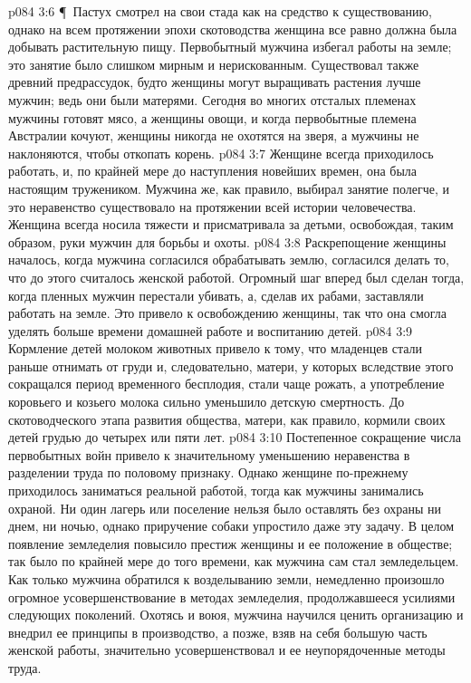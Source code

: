 \vs p084 3:6 \P\ Пастух смотрел на свои стада как на средство к существованию, однако на всем протяжении эпохи скотоводства женщина все равно должна была добывать растительную пищу. Первобытный мужчина избегал работы на земле; это занятие было слишком мирным и нерискованным. Существовал также древний предрассудок, будто женщины могут выращивать растения лучше мужчин; ведь они были матерями. Сегодня во многих отсталых племенах мужчины готовят мясо, а женщины овощи, и когда первобытные племена Австралии кочуют, женщины никогда не охотятся на зверя, а мужчины не наклоняются, чтобы откопать корень.
\vs p084 3:7 Женщине всегда приходилось работать, и, по крайней мере до наступления новейших времен, она была настоящим тружеником. Мужчина же, как правило, выбирал занятие полегче, и это неравенство существовало на протяжении всей истории человечества. Женщина всегда носила тяжести и присматривала за детьми, освобождая, таким образом, руки мужчин для борьбы и охоты.
\vs p084 3:8 Раскрепощение женщины началось, когда мужчина согласился обрабатывать землю, согласился делать то, что до этого считалось женской работой. Огромный шаг вперед был сделан тогда, когда пленных мужчин перестали убивать, а, сделав их рабами, заставляли работать на земле. Это привело к освобождению женщины, так что она смогла уделять больше времени домашней работе и воспитанию детей.
\vs p084 3:9 Кормление детей молоком животных привело к тому, что младенцев стали раньше отнимать от груди и, следовательно, матери, у которых вследствие этого сокращался период временного бесплодия, стали чаще рожать, а употребление коровьего и козьего молока сильно уменьшило детскую смертность. До скотоводческого этапа развития общества, матери, как правило, кормили своих детей грудью до четырех или пяти лет.
\vs p084 3:10 Постепенное сокращение числа первобытных войн привело к значительному уменьшению неравенства в разделении труда по половому признаку. Однако женщине по\hyp{}прежнему приходилось заниматься реальной работой, тогда как мужчины занимались охраной. Ни один лагерь или поселение нельзя было оставлять без охраны ни днем, ни ночью, однако приручение собаки упростило даже эту задачу. В целом появление земледелия повысило престиж женщины и ее положение в обществе; так было по крайней мере до того времени, как мужчина сам стал земледельцем. Как только мужчина обратился к возделыванию земли, немедленно произошло огромное усовершенствование в методах земледелия, продолжавшееся усилиями следующих поколений. Охотясь и воюя, мужчина научился ценить организацию и внедрил ее принципы в производство, а позже, взяв на себя большую часть женской работы, значительно усовершенствовал и ее неупорядоченные методы труда.
